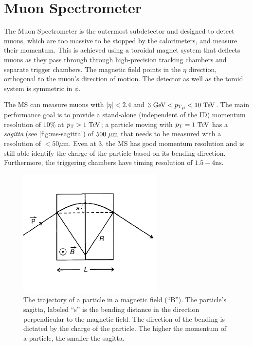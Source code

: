 \section{Muon Spectrometer}
The Muon Spectrometer is the outermost subdetector and designed to detect muons, which are too massive to be stopped by the calorimeters, and measure their momentum. This is achieved using a toroidal magnet system that deflects muons as they pass through through  high-precision tracking chambers and separate trigger chambers. The magnetic field points in the $\eta$ direction, orthogonal to the muon's direction of motion. The detector as well as the toroid system is symmetric in $\phi$.

The \ac{MS} can measure muons with $|\eta| < 2.4$ and $3 \GeV < {\pt}_{\mu} < 10 \TeV$. The main performance goal is to provide a stand-alone (independent of the \ac{ID}) momentum resolution of $10\%$ at $\pT > 1 \TeV$; a particle moving with $\pt = 1 \TeV$ has a \emph{sagitta} (see \autoref{fig:ms-sagitta}) of $500~\mu\text{m}$ that needs to be measured with a resolution of $<50\mu\textrm{m}$. Even at 3\TeV, the \ac{MS} has good momentum resolution and is still able identify the charge of the particle based on its bending direction. Furthermore, the triggering chambers have timing resolution of $1.5-4 \textrm{ns}$.  

\begin{figure}[htbp]
\centering
\includegraphics[width=.6\textwidth]{figures/Detector/ms-sagitta.png}
\caption{The trajectory of a particle in a magnetic field (``B''). The particle's sagitta, labeled ``s'' is the bending distance in the direction perpendicular to the magnetic field. The direction of the bending is dictated by the charge of the particle. The higher the momentum of a particle, the smaller the sagitta. \cite{particledetectors-springer}}
\label{fig:ms-sagitta}
\end{figure}


